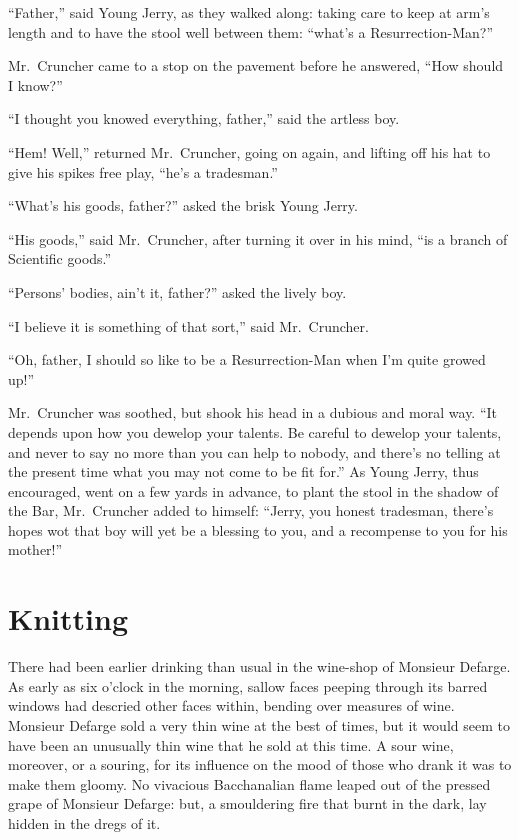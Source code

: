 ``Father,'' said Young Jerry, as they walked along:  taking care to
keep at arm's length and to have the stool well between them:
``what's a Resurrection-Man?''

Mr.\ Cruncher came to a stop on the pavement before he answered,
``How should I know?''

``I thought you knowed everything, father,'' said the artless boy.

``Hem!  Well,'' returned Mr.\ Cruncher, going on again, and lifting off
his hat to give his spikes free play, ``he's a tradesman.''

``What's his goods, father?'' asked the brisk Young Jerry.

``His goods,'' said Mr.\ Cruncher, after turning it over in his mind,
``is a branch of Scientific goods.''

``Persons' bodies, ain't it, father?'' asked the lively boy.

``I believe it is something of that sort,'' said Mr.\ Cruncher.

``Oh, father, I should so like to be a Resurrection-Man when I'm
quite growed up!''

Mr.\ Cruncher was soothed, but shook his head in a dubious and moral
way.  ``It depends upon how you dewelop your talents.  Be careful
to dewelop your talents, and never to say no more than you can help
to nobody, and there's no telling at the present time what you may
not come to be fit for.''  As Young Jerry, thus encouraged, went on
a few yards in advance, to plant the stool in the shadow of the Bar,
Mr.\ Cruncher added to himself:  ``Jerry, you honest tradesman, there's
hopes wot that boy will yet be a blessing to you, and a recompense
to you for his mother!''



\chapter{Knitting}


There had been earlier drinking than usual in the wine-shop of
Monsieur Defarge.  As early as six o'clock in the morning, sallow
faces peeping through its barred windows had descried other faces within,
bending over measures of wine.  Monsieur Defarge sold a very thin wine
at the best of times, but it would seem to have been an unusually thin
wine that he sold at this time.  A sour wine, moreover, or a souring,
for its influence on the mood of those who drank it was to make them
gloomy.  No vivacious Bacchanalian flame leaped out of the pressed grape
of Monsieur Defarge:  but, a smouldering fire that burnt in the dark,
lay hidden in the dregs of it.


